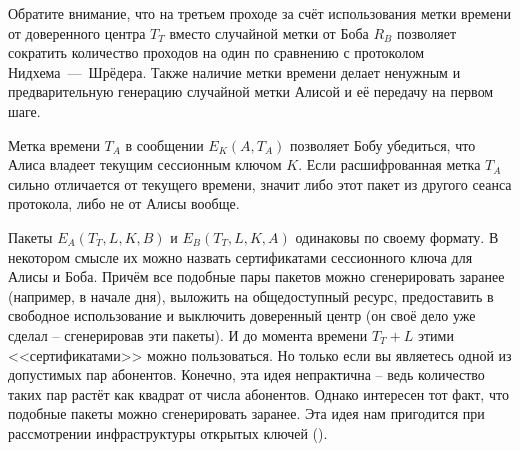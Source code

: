 Обратите внимание, что на третьем проходе за счёт использования метки времени от доверенного центра $T_T$ вместо случайной метки от Боба $R_B$ позволяет сократить количество проходов на один по сравнению с протоколом Нидхема~---~Шрёдера. Также наличие метки времени делает ненужным и предварительную генерацию случайной метки Алисой и её передачу на первом шаге.

Метка времени $T_A$ в сообщении $E_K \left( A, T_A \right)$ позволяет Бобу убедиться, что Алиса владеет текущим сессионным ключом $K$. Если расшифрованная метка $T_A$ сильно отличается от текущего времени, значит либо этот пакет из другого сеанса протокола, либо не от Алисы вообще.

Пакеты $E_A \left( T_T, L, K, B \right)$ и $E_B \left( T_T, L, K, A \right)$ одинаковы по своему формату. В некотором смысле их можно назвать сертификатами сессионного ключа для Алисы и Боба. Причём все подобные пары пакетов можно сгенерировать заранее (например, в начале дня), выложить на общедоступный ресурс, предоставить в свободное использование и выключить доверенный центр (он своё дело уже сделал -- сгенерировав эти пакеты). И до момента времени $T_T + L$ этими <<сертификатами>> можно пользоваться. Но только если вы являетесь одной из допустимых пар абонентов. Конечно, эта идея непрактична -- ведь количество таких пар растёт как квадрат от числа абонентов. Однако интересен тот факт, что подобные пакеты можно сгенерировать заранее. Эта идея нам пригодится при рассмотрении инфраструктуры открытых ключей ().

